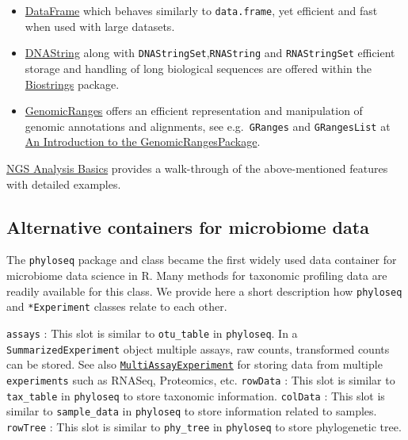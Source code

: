 \documentclass[
]{book}
\providecommand{\tightlist}{%
  \setlength{\itemsep}{0pt}\setlength{\parskip}{0pt}}
\begin{document}
\begin{itemize}
\tightlist
\item
  \href{https://rdrr.io/bioc/S4Vectors/man/DataFrame-class.html}{DataFrame} which behaves similarly to \texttt{data.frame}, yet efficient and fast when used with large datasets.
\item
  \href{https://rdrr.io/bioc/Biostrings/man/DNAString-class.html}{DNAString} along with \texttt{DNAStringSet},\texttt{RNAString} and \texttt{RNAStringSet} efficient storage and handling of long biological sequences are offered within the \href{https://rdrr.io/bioc/Biostrings/}{Biostrings} package.
\item
  \href{https://bioconductor.org/packages/3.13/bioc/html/GenomicRanges.html}{GenomicRanges} offers an efficient representation and manipulation of genomic annotations and alignments, see e.g.~\texttt{GRanges} and \texttt{GRangesList} at \href{https://bioconductor.org/packages/release/bioc/vignettes/GenomicRanges/inst/doc/GenomicRangesIntroduction.html}{An Introduction to the GenomicRangesPackage}.
\end{itemize}

\href{http://girke.bioinformatics.ucr.edu/GEN242/tutorials/rsequences/rsequences/}{NGS Analysis Basics} provides a walk-through of the above-mentioned features with detailed examples.

\hypertarget{alternative-containers-for-microbiome-data}{%
\subsection{Alternative containers for microbiome data}\label{alternative-containers-for-microbiome-data}}

The \texttt{phyloseq} package and class became the first widely used data
container for microbiome data science in R. Many methods for taxonomic
profiling data are readily available for this class. We provide here a
short description how \texttt{phyloseq} and \texttt{*Experiment} classes relate to
each other.

\texttt{assays} : This slot is similar to \texttt{otu\_table} in \texttt{phyloseq}. In a
\texttt{SummarizedExperiment} object multiple assays, raw
counts, transformed counts can be stored. See also
\href{https://bioconductor.org/packages/release/bioc/html/MultiAssayExperiment.html}{\texttt{MultiAssayExperiment}}
for storing data from multiple \texttt{experiments} such as
RNASeq, Proteomics, etc. \texttt{rowData} : This slot is
similar to \texttt{tax\_table} in \texttt{phyloseq} to store taxonomic
information. \texttt{colData} : This slot is similar to
\texttt{sample\_data} in \texttt{phyloseq} to store information
related to samples. \texttt{rowTree} : This slot is similar
to \texttt{phy\_tree} in \texttt{phyloseq} to store phylogenetic tree.
\end{document}
